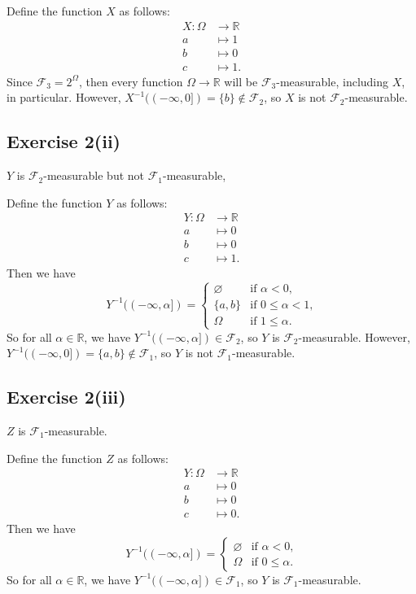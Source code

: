 \documentclass[12pt]{article}
\newenvironment{problem}
    {\begin{lrbox}{\mybox}\begin{minipage}{0.98\textwidth}}
    {\end{minipage}\end{lrbox}\framebox[\textwidth]{\usebox{\mybox}}}
\let\emptyset\varnothing %
\newcommand{\R}{\mathbb{R}} %
\newcommand{\FF}{\mathcal{F}} %
\newcommand{\<}{\left\langle} %
\renewcommand{\>}{\right\rangle} %
\begin{document}
Define the function $X$ as follows:
\begin{align*}
    X: \Omega &\to \R \\
    a &\mapsto 1 \\
    b &\mapsto 0 \\
    c &\mapsto 1.
\end{align*}
Since $\FF_3=2^\Omega$, then every function $\Omega\to\R$ will be $\FF_3$-measurable, including $X$, in particular. However, $X^{-1}((-\infty,0]) = \{b\} \notin \FF_2$, so $X$ is not $\FF_2$-measurable.

\subsection*{Exercise 2(ii)}
\begin{problem}
    $Y$ is $\FF_2$-measurable but not $\FF_1$-measurable,
\end{problem}
\medskip

Define the function $Y$ as follows:
\begin{align*}
    Y: \Omega &\to \R \\
    a &\mapsto 0 \\
    b &\mapsto 0 \\
    c &\mapsto 1.
\end{align*}
Then we have
\[Y^{-1}((-\infty,\alpha]) =
    \begin{cases}
        \emptyset &\text{if $\alpha <0$,} \\
        \{a,b\}  &\text{if $0\leq\alpha<1$,} \\
        \Omega  &\text{if $1\leq\alpha$.}
    \end{cases}
\]
So for all $\alpha\in\R$, we have $Y^{-1}((-\infty,\alpha])\in\FF_2$, so $Y$ is $\FF_2$-measurable. However, $Y^{-1}((-\infty,0]) = \{a,b\}\notin\FF_1$, so $Y$ is not $\FF_1$-measurable.

\newpage
\subsection*{Exercise 2(iii)}
\begin{problem}
    $Z$ is $\FF_1$-measurable.
\end{problem}
\medskip

Define the function $Z$ as follows:
\begin{align*}
    Y: \Omega &\to \R \\
    a &\mapsto 0 \\
    b &\mapsto 0 \\
    c &\mapsto 0.
\end{align*}
Then we have
\[Y^{-1}((-\infty,\alpha]) =
    \begin{cases}
        \emptyset &\text{if $\alpha <0$,} \\
        \Omega  &\text{if $0\leq\alpha$.}
    \end{cases}
\]
So for all $\alpha\in\R$, we have $Y^{-1}((-\infty,\alpha])\in\FF_1$, so $Y$ is $\FF_1$-measurable.
\end{document}
